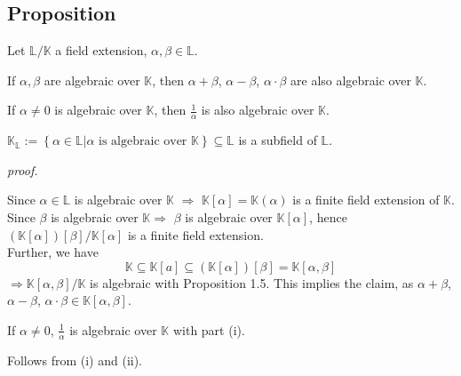 \documentclass[12pt]{book}
\begin{document}
\begin{spacing}{1.3}
\subsection{Proposition} %
Let $\mathbb{L}/\mathbb{K}$ a field extension, $\alpha, \beta \in \mathbb{L}$.
\begin{compactenum}
\item If $\alpha, \beta$ are algebraic over $\mathbb{K}$, then $\alpha + \beta$, $\alpha - \beta$, $\alpha \cdot \beta$ are also algebraic over $\mathbb{K}$.
\item If $\alpha \neq0$ is algebraic over $\mathbb{K}$, then $\frac{1}{\alpha}$ is also algebraic over $\mathbb{K}$.
\item $\mathbb{K}_{\mathbb{L}}:=\left\{\alpha \in \mathbb{L} \big \vert \alpha \textrm{ is algebraic over } \mathbb{K}\right\} \subseteq \mathbb{L}$ is a subfield of $\mathbb{L}$.
\end{compactenum}
\textit{proof.}
\begin{compactenum}
\item Since $\alpha \in \mathbb{L}$ is algebraic over $\mathbb{K}$ $\Rightarrow$ $\mathbb{K}[\alpha]=\mathbb{K}(\alpha)$ is a finite field extension of $\mathbb{K}$.\\
Since $\beta$ is algebraic over $\mathbb{K} \Rightarrow$ $\beta$ is algebraic over $\mathbb{K}[\alpha]$, hence $\left(\mathbb{K}[\alpha]\right)[\beta]/\mathbb{K}[\alpha]$ is a finite field extension.\\
Further, we have $$\mathbb{K} \subseteq \mathbb{K}[a] \subseteq \left(\mathbb{K}[\alpha]\right)[\beta]=\mathbb{K}[\alpha, \beta]$$ $\Rightarrow \mathbb{K}[\alpha, \beta]/\mathbb{K}$ is algebraic with Proposition 1.5.
This implies the claim, as $\alpha + \beta$, $\alpha-\beta$, $\alpha \cdot \beta \in \mathbb{K}[\alpha, \beta]$.
\item If $\alpha \neq 0$, $\frac{1}{\alpha}$ is algebraic over $\mathbb{K}$ with part (i).
\item Follows from (i) and (ii).
\end{compactenum}


\end{spacing}
\end{document}
